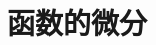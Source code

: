 \documentclass{article}
\begin{document}
  \tableofcontents
  \newpage

  \section{函数的微分}
    
\end{document}
